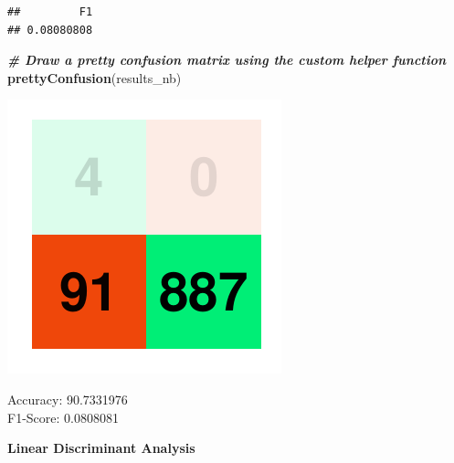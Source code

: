\documentclass[
]{article}
\newenvironment{Shaded}{\begin{snugshade}}{\end{snugshade}}
\newcommand{\CommentTok}[1]{\textcolor[rgb]{0.00,0.40,1.00}{\textbf{\textit{#1}}}}
\newcommand{\DataTypeTok}[1]{\textcolor[rgb]{0.74,0.68,0.62}{\underline{#1}}}
\newcommand{\KeywordTok}[1]{\textcolor[rgb]{0.26,0.66,0.93}{\textbf{#1}}}
\newcommand{\NormalTok}[1]{\textcolor[rgb]{0.74,0.68,0.62}{#1}}
\newcommand{\OperatorTok}[1]{\textcolor[rgb]{0.74,0.68,0.62}{#1}}
\newcommand{\StringTok}[1]{\textcolor[rgb]{0.02,0.61,0.04}{#1}}
\begin{document}
\begin{verbatim}
##         F1 
## 0.08080808
\end{verbatim}

\begin{Shaded}
\begin{Highlighting}[]
\CommentTok{# Draw a pretty confusion matrix using the custom helper function}
\KeywordTok{prettyConfusion}\NormalTok{(results_nb)}
\end{Highlighting}
\end{Shaded}

\includegraphics{Bank_Loan_Classification_files/figure-latex/unnamed-chunk-29-1.pdf}

Accuracy: 90.7331976\\
F1-Score: 0.0808081

\textbf{Linear Discriminant Analysis}

\begin{Shaded}
\end{Shaded}
\end{document}
